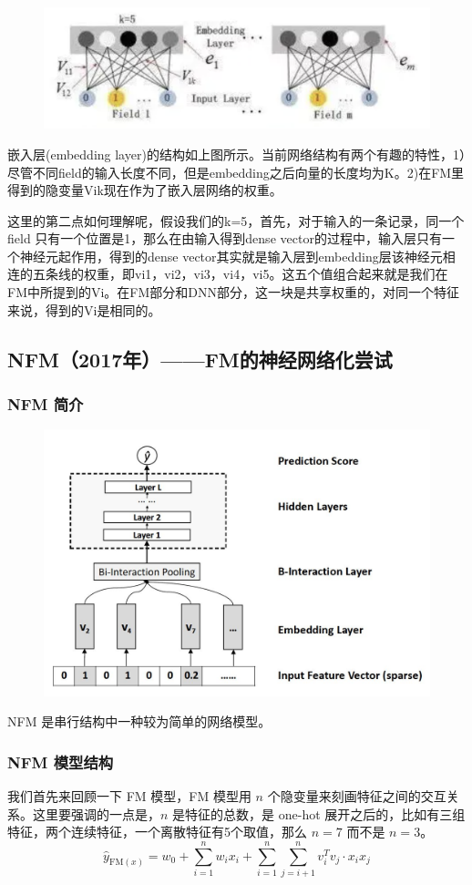 \documentclass[12pt]{article}
\begin{document}
\begin{figure}[H]
    \centering
    \includegraphics[width=.8\textwidth]{fig/DeepFM_Deep_Detail_Embedding.png}
\end{figure}

嵌入层(embedding layer)的结构如上图所示。当前网络结构有两个有趣的特性，1）尽管不同field的输入长度不同，但是embedding之后向量的长度均为K。2)在FM里得到的隐变量Vik现在作为了嵌入层网络的权重。

这里的第二点如何理解呢，假设我们的k=5，首先，对于输入的一条记录，同一个field 只有一个位置是1，那么在由输入得到dense vector的过程中，输入层只有一个神经元起作用，得到的dense vector其实就是输入层到embedding层该神经元相连的五条线的权重，即vi1，vi2，vi3，vi4，vi5。这五个值组合起来就是我们在FM中所提到的Vi。在FM部分和DNN部分，这一块是共享权重的，对同一个特征来说，得到的Vi是相同的。


\subsection{NFM（2017年）——FM的神经网络化尝试}
\subsubsection{NFM 简介}
\begin{figure}[H]
    \centering
    \includegraphics[width=.6\textwidth]{fig/NFM_Structure.jpg}
\end{figure}

NFM 是串行结构中一种较为简单的网络模型。

\subsubsection{NFM 模型结构\cite{Recommender_System_With_Deep_Learning_NFM}}
我们首先来回顾一下 FM 模型，FM 模型用 $n$ 个隐变量来刻画特征之间的交互关系。这里要强调的一点是，$n$ 是特征的总数，是 one-hot 展开之后的，比如有三组特征，两个连续特征，一个离散特征有5个取值，那么 $n=7$ 而不是 $n=3$。
$$
\hat{y}_{\text{FM}(x)} = w_0 + \sum_{i=1}^nw_ix_i + \sum_{i=1}^n\sum_{j=i+1}^nv_i^Tv_j \cdot x_ix_j  
$$
\end{document}
